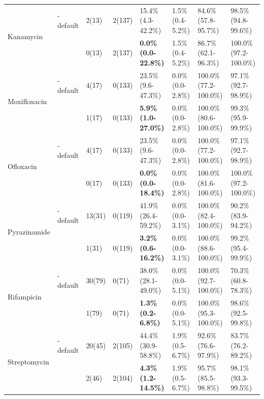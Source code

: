 \begin{table}
{\begin{tabular}{@{}llllllll@{}}
\multirow{2}{*}{Kanamycin}    & \mykrobe{}-default & 2(13)  & 2(137) & 15.4\% (4.3-42.2\%)         & 1.5\% (0.4-5.2\%)   & 84.6\% (57.8-95.7\%)   & 98.5\% (94.8-99.6\%)   \\
                              & \mykrobe{}         & 0(13)  & 2(137) & \textbf{0.0\% (0.0-22.8\%)} & 1.5\% (0.4-5.2\%)   & 86.7\% (62.1-96.3\%)   & 100.0\% (97.2-100.0\%) \\ \cmidrule(l){2-8} 
\multirow{2}{*}{Moxifloxacin} & \mykrobe{}-default & 4(17)  & 0(133) & 23.5\% (9.6-47.3\%)         & 0.0\% (0.0-2.8\%)   & 100.0\% (77.2-100.0\%) & 97.1\% (92.7-98.9\%)   \\
                              & \mykrobe{}         & 1(17)  & 0(133) & \textbf{5.9\% (1.0-27.0\%)} & 0.0\% (0.0-2.8\%)   & 100.0\% (80.6-100.0\%) & 99.3\% (95.9-99.9\%)   \\ \cmidrule(l){2-8} 
\multirow{2}{*}{Ofloxacin}    & \mykrobe{}-default & 4(17)  & 0(133) & 23.5\% (9.6-47.3\%)         & 0.0\% (0.0-2.8\%)   & 100.0\% (77.2-100.0\%) & 97.1\% (92.7-98.9\%)   \\
                              & \mykrobe{}         & 0(17)  & 0(133) & \textbf{0.0\% (0.0-18.4\%)} & 0.0\% (0.0-2.8\%)   & 100.0\% (81.6-100.0\%) & 100.0\% (97.2-100.0\%) \\ \cmidrule(l){2-8} 
\multirow{2}{*}{Pyrazinamide}  & \mykrobe{}-default & 13(31) & 0(119) & 41.9\% (26.4-59.2\%) & 0.0\% (0.0-3.1\%)          & 100.0\% (82.4-100.0\%) & 90.2\% (83.9-94.2\%) \\
                              & \mykrobe{}         & 1(31)  & 0(119) & \textbf{3.2\% (0.6-16.2\%)} & 0.0\% (0.0-3.1\%)   & 100.0\% (88.6-100.0\%) & 99.2\% (95.4-99.9\%)   \\ \cmidrule(l){2-8} 
\multirow{2}{*}{Rifampicin}   & \mykrobe{}-default & 30(79) & 0(71)  & 38.0\% (28.1-49.0\%)        & 0.0\% (0.0-5.1\%)   & 100.0\% (92.7-100.0\%) & 70.3\% (60.8-78.3\%)   \\
                              & \mykrobe{}         & 1(79)  & 0(71)  & \textbf{1.3\% (0.2-6.8\%)}  & 0.0\% (0.0-5.1\%)   & 100.0\% (95.3-100.0\%) & 98.6\% (92.5-99.8\%)   \\ \cmidrule(l){2-8} 
\multirow{2}{*}{Streptomycin} & \mykrobe{}-default & 20(45) & 2(105) & 44.4\% (30.9-58.8\%)        & 1.9\% (0.5-6.7\%)   & 92.6\% (76.6-97.9\%)   & 83.7\% (76.2-89.2\%)   \\
                              & \mykrobe{}         & 2(46)  & 2(104) & \textbf{4.3\% (1.2-14.5\%)} & 1.9\% (0.5-6.7\%)   & 95.7\% (85.5-98.8\%)   & 98.1\% (93.3-99.5\%)   \\ \cmidrule(l){2-8} 

\end{tabular}}
\end{table}
